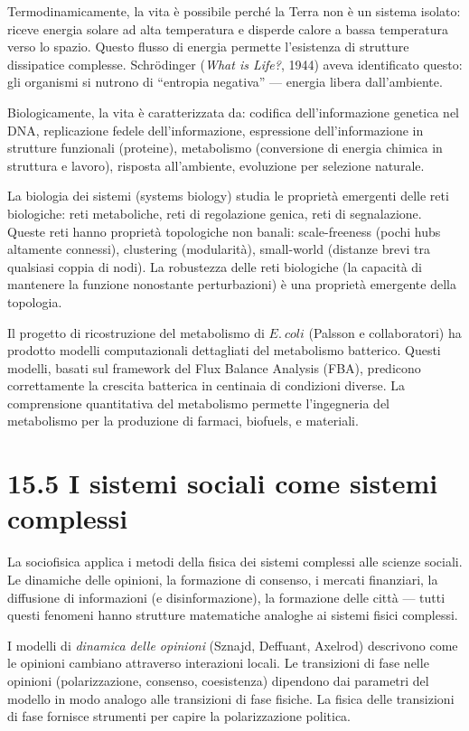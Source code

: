 \documentclass[11.5pt,a4paper,openany]{book}
\theoremstyle{remark}
\begin{document}
Termodinamicamente, la vita è possibile perché la Terra non è un sistema isolato: riceve energia solare ad alta temperatura e disperde calore a bassa temperatura verso lo spazio. Questo flusso di energia permette l'esistenza di strutture dissipatice complesse. Schrödinger (\textit{What is Life?}, 1944) aveva identificato questo: gli organismi si nutrono di ``entropia negativa'' --- energia libera dall'ambiente.

Biologicamente, la vita è caratterizzata da: codifica dell'informazione genetica nel DNA, replicazione fedele dell'informazione, espressione dell'informazione in strutture funzionali (proteine), metabolismo (conversione di energia chimica in struttura e lavoro), risposta all'ambiente, evoluzione per selezione naturale.

La biologia dei sistemi (systems biology) studia le proprietà emergenti delle reti biologiche: reti metaboliche, reti di regolazione genica, reti di segnalazione. Queste reti hanno proprietà topologiche non banali: scale-freeness (pochi hubs altamente connessi), clustering (modularità), small-world (distanze brevi tra qualsiasi coppia di nodi). La robustezza delle reti biologiche (la capacità di mantenere la funzione nonostante perturbazioni) è una proprietà emergente della topologia.

Il progetto di ricostruzione del metabolismo di $E.\ coli$ (Palsson e collaboratori) ha prodotto modelli computazionali dettagliati del metabolismo batterico. Questi modelli, basati sul framework del Flux Balance Analysis (FBA), predicono correttamente la crescita batterica in centinaia di condizioni diverse. La comprensione quantitativa del metabolismo permette l'ingegneria del metabolismo per la produzione di farmaci, biofuels, e materiali.

\section{15.5 I sistemi sociali come sistemi complessi}

La sociofisica applica i metodi della fisica dei sistemi complessi alle scienze sociali. Le dinamiche delle opinioni, la formazione di consenso, i mercati finanziari, la diffusione di informazioni (e disinformazione), la formazione delle città --- tutti questi fenomeni hanno strutture matematiche analoghe ai sistemi fisici complessi.

I modelli di \textit{dinamica delle opinioni} (Sznajd, Deffuant, Axelrod) descrivono come le opinioni cambiano attraverso interazioni locali. Le transizioni di fase nelle opinioni (polarizzazione, consenso, coesistenza) dipendono dai parametri del modello in modo analogo alle transizioni di fase fisiche. La fisica delle transizioni di fase fornisce strumenti per capire la polarizzazione politica.
\end{document}
